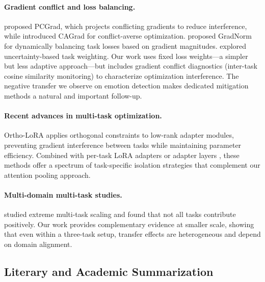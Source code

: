 \documentclass[11pt]{article}
\begin{document}
\paragraph{Gradient conflict and loss balancing.} \citet{yu2020gradient} proposed PCGrad, which projects conflicting gradients to reduce interference, while \citet{liu2021conflict} introduced CAGrad for conflict-averse optimization. \citet{chen2018gradnorm} proposed GradNorm for dynamically balancing task losses based on gradient magnitudes. \citet{kendall2018multi} explored uncertainty-based task weighting. Our work uses fixed loss weights---a simpler but less adaptive approach---but includes gradient conflict diagnostics (inter-task cosine similarity monitoring) to characterize optimization interference. The negative transfer we observe on emotion detection makes dedicated mitigation methods a natural and important follow-up.

\paragraph{Recent advances in multi-task optimization.} Ortho-LoRA \citep{ortholora2025} applies orthogonal constraints to low-rank adapter modules, preventing gradient interference between tasks while maintaining parameter efficiency. Combined with per-task LoRA adapters \citep{hu2022lora} or adapter layers \citep{houlsby2019parameter}, these methods offer a spectrum of task-specific isolation strategies that complement our attention pooling approach.

\paragraph{Multi-domain multi-task studies.} \citet{aribandi2022ext5} studied extreme multi-task scaling and found that not all tasks contribute positively. Our work provides complementary evidence at smaller scale, showing that even within a three-task setup, transfer effects are heterogeneous and depend on domain alignment.

\subsection{Literary and Academic Summarization}
\end{document}
